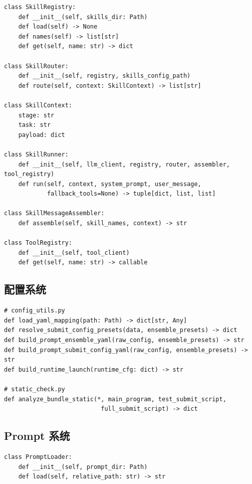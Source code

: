 \documentclass[12pt,a4paper]{ctexart}
\begin{document}
\begin{lstlisting}[style=pycode]
class SkillRegistry:
    def __init__(self, skills_dir: Path)
    def load(self) -> None
    def names(self) -> list[str]
    def get(self, name: str) -> dict

class SkillRouter:
    def __init__(self, registry, skills_config_path)
    def route(self, context: SkillContext) -> list[str]

class SkillContext:
    stage: str
    task: str
    payload: dict

class SkillRunner:
    def __init__(self, llm_client, registry, router, assembler, tool_registry)
    def run(self, context, system_prompt, user_message,
            fallback_tools=None) -> tuple[dict, list, list]

class SkillMessageAssembler:
    def assemble(self, skill_names, context) -> str

class ToolRegistry:
    def __init__(self, tool_client)
    def get(self, name: str) -> callable
\end{lstlisting}

\subsection{配置系统}

\begin{lstlisting}[style=pycode]
# config_utils.py
def load_yaml_mapping(path: Path) -> dict[str, Any]
def resolve_submit_config_presets(data, ensemble_presets) -> dict
def build_prompt_ensemble_yaml(raw_config, ensemble_presets) -> str
def build_prompt_submit_config_yaml(raw_config, ensemble_presets) -> str
def build_runtime_launch(runtime_cfg: dict) -> str

# static_check.py
def analyze_bundle_static(*, main_program, test_submit_script,
                           full_submit_script) -> dict
\end{lstlisting}

\subsection{Prompt 系统}

\begin{lstlisting}[style=pycode]
class PromptLoader:
    def __init__(self, prompt_dir: Path)
    def load(self, relative_path: str) -> str
\end{lstlisting}
\end{document}
